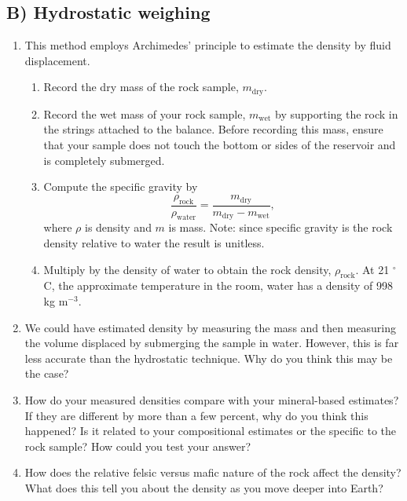 \documentclass[11pt,a4paper,final]{article}
\begin{document}
\subsection*{B) Hydrostatic weighing}
\begin{enumerate}
    \item This method employs Archimedes' principle to estimate the density by fluid displacement.
    \begin{enumerate}
        \item Record the dry mass of the rock sample, $m_{\mathrm{dry}}$.

        \item Record the wet mass of your rock sample, $m_{\mathrm{wet}}$ by supporting the rock in the strings attached to the balance.  Before recording this mass, ensure that your sample does not touch the bottom or sides of the reservoir and is completely submerged.
        
        \item Compute the specific gravity by
        \begin{equation}
            \frac{\rho_{\mathrm{rock}}}{\rho_{\mathrm{water}}} =
            \frac{m_{\mathrm{dry}}}{m_{\mathrm{dry}} - m_{\mathrm{wet}}} ,
        \end{equation}
        where $\rho$ is density and $m$ is mass.  Note: since specific gravity
        is the rock density relative to water the result is unitless.

        \item Multiply by the density of water to obtain the rock density, $\rho_{\mathrm{rock}}$. At 21 $^\circ$C, the approximate temperature in the room, water has a density of 998 kg m$^{-3}$.
    \end{enumerate}

    \item We could have estimated density by measuring the mass and then measuring the volume displaced by submerging the sample in water.  However, this is far less accurate than the hydrostatic technique. Why do you think this may be the case?

    \item How do your measured densities compare with your mineral-based estimates?  If they are different by more than a few percent, why do you think this happened?  Is it related to your compositional estimates or the specific to the rock sample?  How could you test your answer?

    \item How does the relative felsic versus mafic nature of the rock affect the density?  What does this tell you about the density as you move deeper into Earth?
\end{enumerate}
\end{document}
